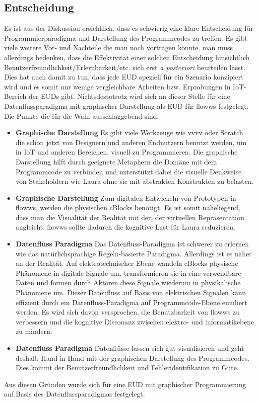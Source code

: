 \subsection{Entscheidung}
Es ist aus der Diskussion ersichtlich, dass es schwierig eine klare Entscheidung für Programmierparadigma und Darstellung des Programmcodes zu treffen. Es gibt viele weitere Vor- und Nachteile die man noch vortragen könnte, man muss allerdings bedenken, dass die Effektivität einer solchen Entscheidung hinsichtlich Benutzerfreundlichkeit/Erlernbarkeit/etc. sich erst \textit{a posteriori} beurteilen lässt. Dies hat auch damit zu tun, dass jede \ac{EUD} speziell für ein Szenario konzipiert wird und es somit nur wenige vergleichbare Arbeiten bzw. Erprobungen in \ac{IoT}-Bereich der \acp{EUD} gibt. Nichtsdestotrotz wird sich an dieser Stelle für eine Datenflussparadigma mit graphischer Darstellung als \ac{EUD} für flowws festgelegt. Die Punkte die für die Wahl ausschlaggebend sind:
\begin{itemize}
    \item \textbf{Graphische Darstellung} Es gibt viele Werkzeuge wie vvvv oder Scratch die schon jetzt von Designern und anderen Endnutzern benutzt werden, um in \ac{IoT} und anderen Bereichen, visuell zu Programmieren. Die graphische Darstellung hilft durch geeignete Metaphern die Domäne mit dem Programmcode zu verbinden und unterstützt dabei die visuelle Denkweise von Stakeholdern wie Laura ohne sie mit abstrakten Konstrukten zu belasten.
    \item \textbf{Graphische Darstellung} Zum digitalen Entwickeln von Prototypen in flowws, werden die physischen cBlocks benötigt. Es ist somit naheliegend, dass man die Visualität der Realität mit der, der virtuellen Repräsentation angleicht. flowws sollte dadurch die kognitive Last für Laura reduzieren.
    \item \textbf{Datenfluss Paradigma} Das Datenfluss-Paradigma ist schwerer zu erlernen wie das natürlichsprachige Regeln-basierte Paradigma. Allerdings ist es näher an der Realität. Auf elektrotechnischer Ebene wandeln cBlocks physische Phänomene in digitale Signale um, transformieren sie in eine verwendbare Daten und formen durch Aktoren diese Signale wiederum in physikalische Phänomene um. Dieser Datenfluss auf Basis von elektrischen Signalen kann effizient durch ein Datenfluss-Paradigma auf Programmcode-Ebene emuliert werden. Es wird sich davon versprochen, die Benutzbarkeit von flowws zu verbessern und die kognitive Dissonanz zwischen elektro- und informatikebene zu mindern.
    \item \textbf{Datenfluss Paradigma} Datenflüsse lassen sich gut visualisieren und  geht deshalb Hand-in-Hand mit der graphischen Darstellung des Programmcodes. Dies kommt der Benutzerfreundlichkeit und Fehleridentifikation zu Gute.
\end{itemize}

Aus diesen Gründen wurde sich für eine \ac{EUD} mit graphischer Programmierung auf Basis des Datenflussparadigmas festgelegt.

